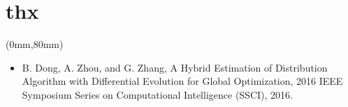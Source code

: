 \documentclass[xcolor=dvipsnames]{beamer}
\newenvironment{reference}[2]{%
  \begin{textblock*}{\textwidth}(#1,#2)
     \bgroup\fontsize{6pt}{\baselineskip}\selectfont\color[RGB]{0,112,192}}{\egroup\end{textblock*}}
\begin{document}
    \section*{thx}
        \begin{frame}
        \begin{center}
        \fontsize{60pt}{\baselineskip}\selectfont {}
        \end{center}
        \begin{reference}{0mm}{80mm}
        \begin{itemize}
        \item  B. Dong, A. Zhou, and G. Zhang, A Hybrid Estimation of Distribution Algorithm with Differential Evolution for Global Optimization, 2016 IEEE Symposium Series on Computational Intelligence (SSCI), 2016.
        \end{itemize}
        \end{reference}
        \end{frame}
\end{document}
